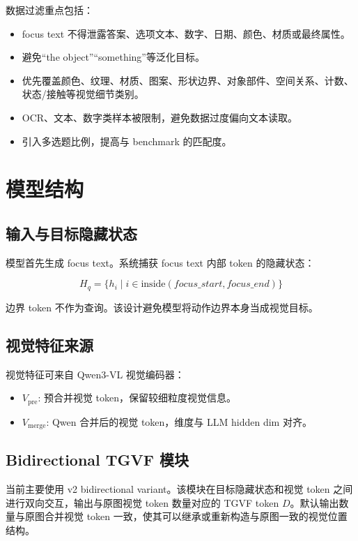 \documentclass[10pt,twocolumn]{ctexart}
\begin{document}
数据过滤重点包括：

\begin{itemize}
  \item focus text 不得泄露答案、选项文本、数字、日期、颜色、材质或最终属性。
  \item 避免“the object”“something”等泛化目标。
  \item 优先覆盖颜色、纹理、材质、图案、形状边界、对象部件、空间关系、计数、状态/接触等视觉细节类别。
  \item OCR、文本、数字类样本被限制，避免数据过度偏向文本读取。
  \item 引入多选题比例，提高与 benchmark 的匹配度。
\end{itemize}

\section{模型结构}

\subsection{输入与目标隐藏状态}

模型首先生成 focus text。系统捕获 focus text 内部 token 的隐藏状态：

\[
H_q = \{h_i \mid i \in \mathrm{inside}(focus\_start, focus\_end)\}
\]

边界 token 不作为查询。该设计避免模型将动作边界本身当成视觉目标。

\subsection{视觉特征来源}

视觉特征可来自 Qwen3-VL 视觉编码器：

\begin{itemize}
  \item $V_{\mathrm{pre}}$: 预合并视觉 token，保留较细粒度视觉信息。
  \item $V_{\mathrm{merge}}$: Qwen 合并后的视觉 token，维度与 LLM hidden dim 对齐。
\end{itemize}

\subsection{Bidirectional TGVF 模块}

当前主要使用 v2 bidirectional variant。该模块在目标隐藏状态和视觉 token 之间进行双向交互，输出与原图视觉 token 数量对应的 TGVF token $D$。默认输出数量与原图合并视觉 token 一致，使其可以继承或重新构造与原图一致的视觉位置结构。
\end{document}
